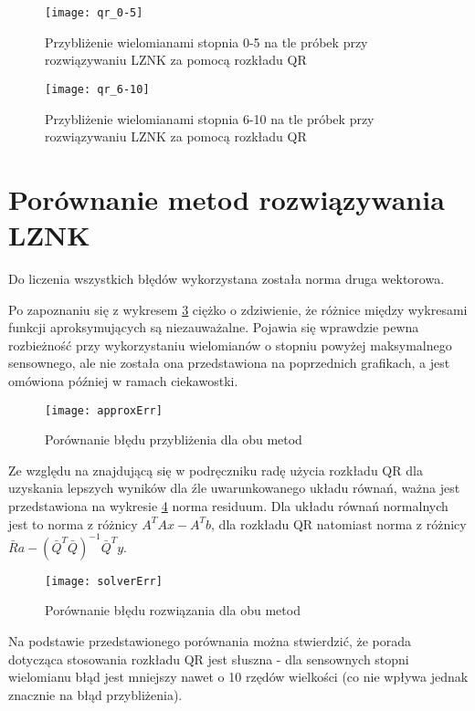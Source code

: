 \documentclass[12pt]{article}
\begin{document}
\begin{figure}[!htbp]
\centering
\texttt{[image: qr\_0-5]}
\centering
\caption{Przybliżenie wielomianami stopnia 0-5 na tle próbek przy rozwiązywaniu LZNK za pomocą rozkładu QR}
\label{fig:qr_0-5}
\end{figure}
\FloatBarrier

\begin{figure}[!htbp]
\centering
\texttt{[image: qr\_6-10]}
\centering
\caption{Przybliżenie wielomianami stopnia 6-10 na tle próbek przy rozwiązywaniu LZNK za pomocą rozkładu QR}
\label{fig:qr_6-10}
\end{figure}
\FloatBarrier


\clearpage
\section{Porównanie metod rozwiązywania LZNK}
\label{section:summary}
Do liczenia wszystkich błędów wykorzystana została norma druga wektorowa.

Po zapoznaniu się z wykresem \ref{fig:approxErr} ciężko o zdziwienie, że różnice między wykresami funkcji aproksymujących są niezauważalne. Pojawia się wprawdzie pewna rozbieżność przy wykorzystaniu wielomianów o stopniu powyżej maksymalnego sensownego, ale nie została ona przedstawiona na poprzednich grafikach, a jest omówiona później w ramach ciekawostki.

\begin{figure}[!htbp]
\centering
\texttt{[image: approxErr]}
\centering
\caption{Porównanie błędu przybliżenia dla obu metod}
\label{fig:approxErr}
\end{figure}
\FloatBarrier

Ze względu na znajdującą się w podręczniku radę użycia rozkładu QR dla uzyskania lepszych wyników dla źle uwarunkowanego układu równań, ważna jest przedstawiona na wykresie \ref{fig:solverErr} norma residuum. Dla układu równań normalnych jest to norma z różnicy \(A^{T}Ax - A^{T}b\), dla rozkładu QR natomiast norma z różnicy \(\bar{R}a - (\bar{Q}^{T}\bar{Q})^{-1}\bar{Q}^{T}y\).

\begin{figure}[!htbp]
\centering
\texttt{[image: solverErr]}
\centering
\caption{Porównanie błędu rozwiązania dla obu metod}
\label{fig:solverErr}
\end{figure}
\FloatBarrier

Na podstawie przedstawionego porównania można stwierdzić, że porada dotycząca stosowania rozkładu QR jest słuszna - dla sensownych stopni wielomianu błąd jest mniejszy nawet o 10 rzędów wielkości (co nie wpływa jednak znacznie na błąd przybliżenia).
\end{document}
